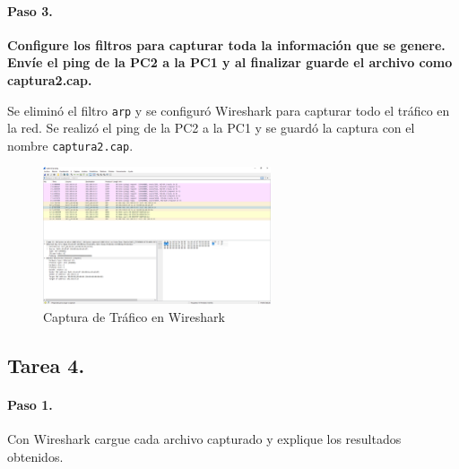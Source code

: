     \paragraph{Paso 3.}
        \textbf{Configure los filtros para capturar toda la información que se genere. Envíe el ping de la PC2 a la PC1 y al finalizar guarde el archivo como captura2.cap.}

        Se eliminó el filtro \texttt{arp} y se configuró Wireshark para capturar todo el tráfico en la red. Se realizó el ping de la PC2 a la PC1 y se guardó la captura con el nombre \texttt{captura2.cap}.

        \begin{figure}[H]
            \centering
            \includegraphics[width=0.6\textwidth]{img/wireshark_datos.PNG}
            \caption{Captura de Tráfico en Wireshark}
            \label{fig:wireshark_datos}
        \end{figure}
    \subsection{Tarea 4.}
        \paragraph{Paso 1.}
        Con Wireshark cargue cada archivo capturado y explique los resultados obtenidos.


